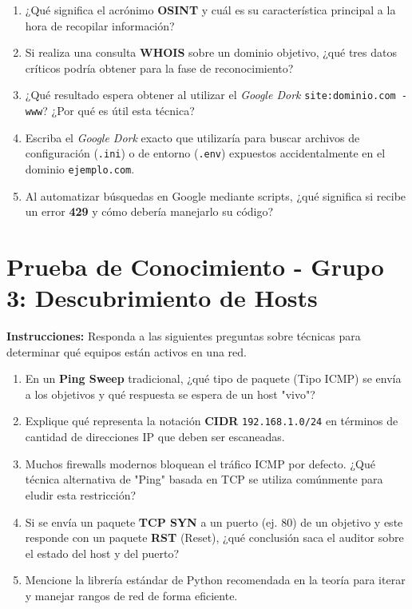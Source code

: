 \documentclass[12pt,a4paper]{article}
\begin{document}
\begin{enumerate}[label=\textbf{\arabic*.}]
    \item ¿Qué significa el acrónimo \textbf{OSINT} y cuál es su característica principal a la hora de recopilar información?
    \item Si realiza una consulta \textbf{WHOIS} sobre un dominio objetivo, ¿qué tres datos críticos podría obtener para la fase de reconocimiento?
    \item ¿Qué resultado espera obtener al utilizar el \textit{Google Dork} \texttt{site:dominio.com -www}? ¿Por qué es útil esta técnica?
    \item Escriba el \textit{Google Dork} exacto que utilizaría para buscar archivos de configuración (\texttt{.ini}) o de entorno (\texttt{.env}) expuestos accidentalmente en el dominio \texttt{ejemplo.com}.
    \item Al automatizar búsquedas en Google mediante scripts, ¿qué significa si recibe un error \textbf{429} y cómo debería manejarlo su código?
\end{enumerate}

\newpage

\section{Prueba de Conocimiento - Grupo 3: Descubrimiento de Hosts}
\textbf{Instrucciones:} Responda a las siguientes preguntas sobre técnicas para determinar qué equipos están activos en una red.

\begin{enumerate}[label=\textbf{\arabic*.}]
    \item En un \textbf{Ping Sweep} tradicional, ¿qué tipo de paquete (Tipo ICMP) se envía a los objetivos y qué respuesta se espera de un host "vivo"?
    \item Explique qué representa la notación \textbf{CIDR} \texttt{192.168.1.0/24} en términos de cantidad de direcciones IP que deben ser escaneadas.
    \item Muchos firewalls modernos bloquean el tráfico ICMP por defecto. ¿Qué técnica alternativa de "Ping" basada en TCP se utiliza comúnmente para eludir esta restricción?
    \item Si se envía un paquete \textbf{TCP SYN} a un puerto (ej. 80) de un objetivo y este responde con un paquete \textbf{RST} (Reset), ¿qué conclusión saca el auditor sobre el estado del host y del puerto?
    \item Mencione la librería estándar de Python recomendada en la teoría para iterar y manejar rangos de red de forma eficiente.
\end{enumerate}
\end{document}
